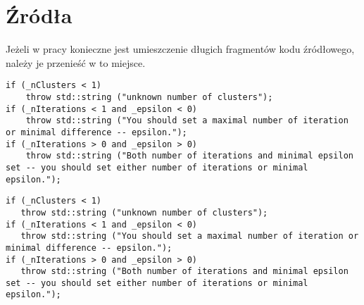 \chapter{Źródła}

Jeżeli w pracy konieczne jest umieszczenie długich fragmentów kodu źródłowego, należy je przenieść w to miejsce.

\begin{lstlisting}
if (_nClusters < 1)
	throw std::string ("unknown number of clusters");
if (_nIterations < 1 and _epsilon < 0)
	throw std::string ("You should set a maximal number of iteration or minimal difference -- epsilon.");
if (_nIterations > 0 and _epsilon > 0)
	throw std::string ("Both number of iterations and minimal epsilon set -- you should set either number of iterations or minimal epsilon.");
\end{lstlisting}


\begin{verbatim}
if (_nClusters < 1)
   throw std::string ("unknown number of clusters");
if (_nIterations < 1 and _epsilon < 0)
   throw std::string ("You should set a maximal number of iteration or minimal difference -- epsilon.");
if (_nIterations > 0 and _epsilon > 0)
   throw std::string ("Both number of iterations and minimal epsilon set -- you should set either number of iterations or minimal epsilon.");
\end{verbatim}
